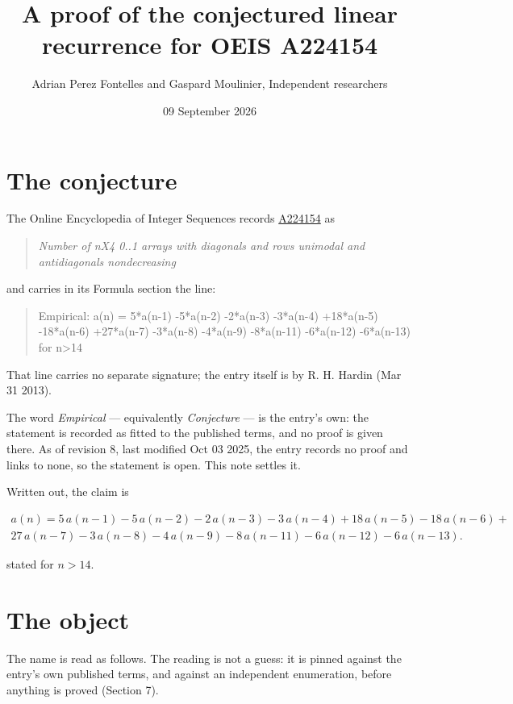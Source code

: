 \documentclass[11pt]{article}
\title{A proof of the conjectured linear recurrence for OEIS A224154}
\author{Adrian Perez Fontelles and Gaspard Moulinier, Independent researchers}
\date{09 September 2026}
\theoremstyle{definition}
\begin{document}
\maketitle
\section{The conjecture}

The Online Encyclopedia of Integer Sequences records \href{https://oeis.org/A224154}{A224154} as

\begin{quote}\itshape Number of nX4 0..1 arrays with diagonals and rows unimodal and antidiagonals nondecreasing\end{quote}

and carries in its Formula section the line:

\begin{quote}\ttfamily Empirical: a(n) = 5*a(n-1) -5*a(n-2) -2*a(n-3) -3*a(n-4) +18*a(n-5) -18*a(n-6) +27*a(n-7) -3*a(n-8) -4*a(n-9) -8*a(n-11) -6*a(n-12) -6*a(n-13) for n>14\end{quote}

That line carries no separate signature; the entry itself is by R. H. Hardin (Mar 31 2013).

The word {\itshape Empirical} --- equivalently {\itshape Conjecture} --- is the entry's own: the statement is recorded as fitted to the published terms, and no proof is given there. As of revision 8, last modified Oct 03 2025, the entry records no proof and links to none, so the statement is open. This note settles it.

Written out, the claim is

\begin{multline*} a(n) = 5\,a(n-1) - 5\,a(n-2) - 2\,a(n-3) - 3\,a(n-4) + 18\,a(n-5) - 18\,a(n-6) + \\ 27\,a(n-7) - 3\,a(n-8) - 4\,a(n-9) - 8\,a(n-11) - 6\,a(n-12) - 6\,a(n-13). \end{multline*}

stated for $n > 14$.

\section{The object}

The name is read as follows. The reading is not a guess: it is pinned against the entry's own published terms, and against an independent enumeration, before anything is proved (Section 7).
\end{document}
